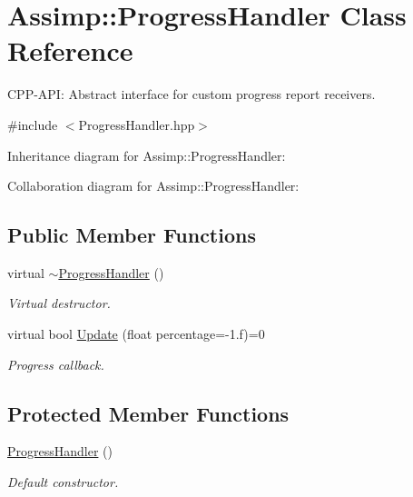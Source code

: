 \hypertarget{class_assimp_1_1_progress_handler}{\section{Assimp\+:\+:Progress\+Handler Class Reference}
\label{class_assimp_1_1_progress_handler}
}


C\+P\+P-\/\+A\+P\+I\+: Abstract interface for custom progress report receivers.  




{\ttfamily \#include $<$Progress\+Handler.\+hpp$>$}



Inheritance diagram for Assimp\+:\+:Progress\+Handler\+:


Collaboration diagram for Assimp\+:\+:Progress\+Handler\+:
\subsection*{Public Member Functions}
\begin{DoxyCompactItemize}
\item 
\hypertarget{class_assimp_1_1_progress_handler_a3ec465a62e1feaae00f585ca0cffb81e}{virtual \hyperlink{class_assimp_1_1_progress_handler_a3ec465a62e1feaae00f585ca0cffb81e}{$\sim$\+Progress\+Handler} ()}\label{class_assimp_1_1_progress_handler_a3ec465a62e1feaae00f585ca0cffb81e}

\begin{DoxyCompactList}\small\item\em Virtual destructor. \end{DoxyCompactList}\item 
virtual bool \hyperlink{class_assimp_1_1_progress_handler_ab08a1d300d434f6dd86ca41747cba448}{Update} (float percentage=-\/1.f)=0
\begin{DoxyCompactList}\small\item\em Progress callback. \end{DoxyCompactList}\end{DoxyCompactItemize}
\subsection*{Protected Member Functions}
\begin{DoxyCompactItemize}
\item 
\hypertarget{class_assimp_1_1_progress_handler_a53b192913e9904c674b851c46e1ea9e8}{\hyperlink{class_assimp_1_1_progress_handler_a53b192913e9904c674b851c46e1ea9e8}{Progress\+Handler} ()}\label{class_assimp_1_1_progress_handler_a53b192913e9904c674b851c46e1ea9e8}

\begin{DoxyCompactList}\small\item\em Default constructor. \end{DoxyCompactList}\end{DoxyCompactItemize}


